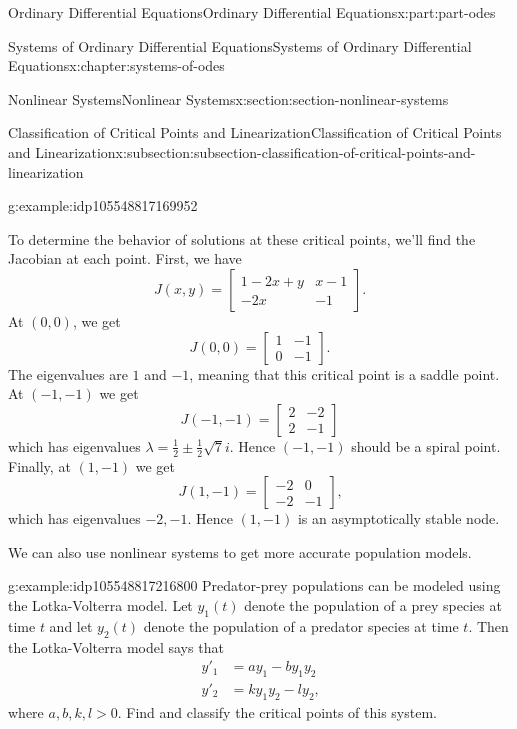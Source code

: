 \documentclass[twoside,10pt,]{book}
\numberwithin{equation}{part}
\newcommand{\amp}{&}
\begin{document}
\begin{partptx}{Ordinary Differential Equations}{}{Ordinary Differential Equations}{}{}{x:part:part-odes}
\begin{chapterptx}{Systems of Ordinary Differential Equations}{}{Systems of Ordinary Differential Equations}{}{}{x:chapter:systems-of-odes}
\begin{sectionptx}{Nonlinear Systems}{}{Nonlinear Systems}{}{}{x:section:section-nonlinear-systems}
\begin{subsectionptx}{Classification of Critical Points and Linearization}{}{Classification of Critical Points and Linearization}{}{}{x:subsection:subsection-classification-of-critical-points-and-linearization}
\begin{example}{}{g:example:idp105548817169952}
\par
To determine the behavior of solutions at these critical points, we'll find the Jacobian at each point. First, we have%
\begin{equation*}
J(x,y) = \begin{bmatrix} 1 - 2x + y \amp x - 1 \\ -2x \amp -1\end{bmatrix}\text{.}
\end{equation*}
At \((0,0)\), we get%
\begin{equation*}
J(0,0) = \begin{bmatrix} 1 \amp -1 \\ 0 \amp -1\end{bmatrix}\text{.}
\end{equation*}
The eigenvalues are \(1\) and \(-1\), meaning that this critical point is a saddle point. At \((-1,-1)\) we get%
\begin{equation*}
J(-1,-1) = \begin{bmatrix}2 \amp -2 \\ 2 \amp -1\end{bmatrix}
\end{equation*}
which has eigenvalues \(\lambda = \frac{1}{2}\pm\frac{1}{2}\sqrt{7}i\). Hence \((-1,-1)\) should be a spiral point. Finally, at \((1,-1)\) we get%
\begin{equation*}
J(1,-1) = \begin{bmatrix} -2 \amp 0 \\ -2 \amp -1\end{bmatrix}\text{,}
\end{equation*}
which has eigenvalues \(-2,-1\). Hence \((1,-1)\) is an asymptotically stable node.%
\end{example}
%
We can also use nonlinear systems to get more accurate population models.%
\begin{example}{}{g:example:idp105548817216800}%
Predator-prey populations can be modeled using the Lotka-Volterra model. Let \(y_{1}(t)\) denote the population of a prey species at time \(t\) and let \(y_{2}(t)\) denote the population of a predator species at time \(t\). Then the Lotka-Volterra model says that%
\begin{align*}
y'_{1} \amp = ay_{1}-by_{1}y_{2}\\
y'_{2} \amp = ky_{1}y_{2} - ly_{2}\text{,}
\end{align*}
where \(a,b,k,l>0\). Find and classify the critical points of this system.%

\end{example}
\end{subsectionptx}
\end{sectionptx}
\end{chapterptx}
\end{partptx}
\end{document}
